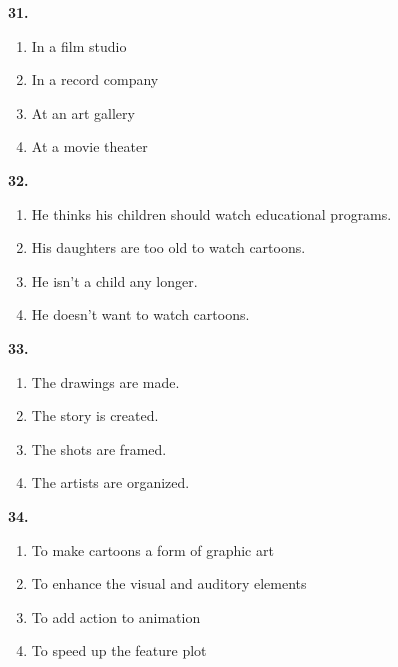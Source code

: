 \documentclass[12pt]{article}
\begin{document}
\noindent\textbf{31.}
\begin{enumerate}[label=(\Alph*),leftmargin=*,itemsep=0.2em]
\item In a film studio
\item In a record company
\item At an art gallery
\item At a movie theater
\end{enumerate}
\par
\vspace{0.25\baselineskip}
\noindent\textbf{32.}
\begin{enumerate}[label=(\Alph*),leftmargin=*,itemsep=0.2em]
\item He thinks his children should watch educational programs.
\item His daughters are too old to watch cartoons.
\item He isn't a child any longer.
\item He doesn't want to watch cartoons.
\end{enumerate}
\par
\vspace{0.25\baselineskip}
\noindent\textbf{33.}
\begin{enumerate}[label=(\Alph*),leftmargin=*,itemsep=0.2em]
\item The drawings are made.
\item The story is created.
\item The shots are framed.
\item The artists are organized.
\end{enumerate}
\par
\vspace{0.25\baselineskip}
\noindent\textbf{34.}
\begin{enumerate}[label=(\Alph*),leftmargin=*,itemsep=0.2em]
\item To make cartoons a form of graphic art
\item To enhance the visual and auditory elements
\item To add action to animation
\item To speed up the feature plot
\end{enumerate}
\par
\vspace{0.25\baselineskip}
\end{document}
